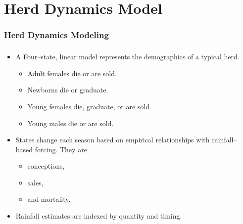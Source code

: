\documentclass[mathserif]{beamer}
\begin{document}
\section{Herd Dynamics Model}

\begin{frame}
  \frametitle{Herd Dynamics Modeling}
  \tableofcontents[currentsection]
\end{frame}

\begin{frame}
  \begin{center}
    \frametitle{\insertsection}
    \begin{itemize}
      \item A Four--state, linear model represents the demographics of a typical herd.
        \begin{itemize}
          \item Adult females die or are sold.
          \item Newborns die or graduate.
          \item Young females die, graduate, or are sold.
          \item Young males die or are sold.
        \end{itemize}
      \item States change each season based on empirical relationships with rainfall--based forcing. They are
        \begin{itemize}
          \item conceptions,
          \item sales,
          \item and mortality.
        \end{itemize}
      \item Rainfall estimates are indexed by quantity and timing.
    \end{itemize}
  \end{center}
\end{frame}
\end{document}
